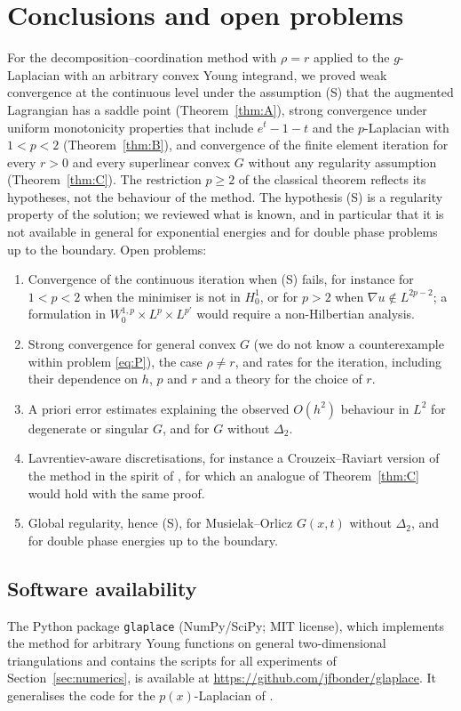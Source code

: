 \documentclass[11pt]{amsart}
\theoremstyle{definition}
\theoremstyle{remark}
\numberwithin{equation}{section}
\begin{document}
\section{Conclusions and open problems}\label{sec:conclusions}
For the decomposition--coordination method with $\rho=r$ applied to the $g$-Laplacian with an arbitrary convex Young integrand, we proved weak convergence at the continuous level under the assumption (S) that the augmented Lagrangian has a saddle point (Theorem~\ref{thm:A}), strong convergence under uniform monotonicity properties that include $e^t-1-t$ and the $p$-Laplacian with $1<p<2$ (Theorem~\ref{thm:B}), and convergence of the finite element iteration for every $r>0$ and every superlinear convex $G$ without any regularity assumption (Theorem~\ref{thm:C}). The restriction $p\ge2$ of the classical theorem reflects its hypotheses, not the behaviour of the method. The hypothesis (S) is a regularity property of the solution; we reviewed what is known, and in particular that it is not available in general for exponential energies and for double phase problems up to the boundary. Open problems:
\begin{enumerate}[label=(\arabic*),leftmargin=2em]
\item Convergence of the continuous iteration when (S) fails, for instance for $1<p<2$ when the minimiser is not in $H^1_0$, or for $p>2$ when $\nabla u\notin L^{2p-2}$; a formulation in $W^{1,p}_0\times L^p\times L^{p'}$ would require a non-Hilbertian analysis.
\item Strong convergence for general convex $G$ (we do not know a counterexample within problem \eqref{eq:P}), the case $\rho\ne r$, and rates for the iteration, including their dependence on $h$, $p$ and $r$ and a theory for the choice of $r$.
\item A priori error estimates explaining the observed $O(h^2)$ behaviour in $L^2$ for degenerate or singular $G$, and for $G$ without $\Delta_2$.
\item Lavrentiev-aware discretisations, for instance a Crouzeix--Raviart version of the method in the spirit of \cite{BalciOrtnerStorn2022}, for which an analogue of Theorem~\ref{thm:C} would hold with the same proof.
\item Global regularity, hence (S), for Musielak--Orlicz $G(x,t)$ without $\Delta_2$, and for double phase energies up to the boundary.
\end{enumerate}

\subsection*{Software availability}
The Python package \texttt{glaplace} (NumPy/SciPy; MIT license), which implements the method for arbitrary Young functions on general two-dimensional triangulations and contains the scripts for all experiments of Section~\ref{sec:numerics}, is available at \url{https://github.com/jfbonder/glaplace}. It generalises the code for the $p(x)$-Laplacian of \cite{AragonFBRubio2023}.
\end{document}
